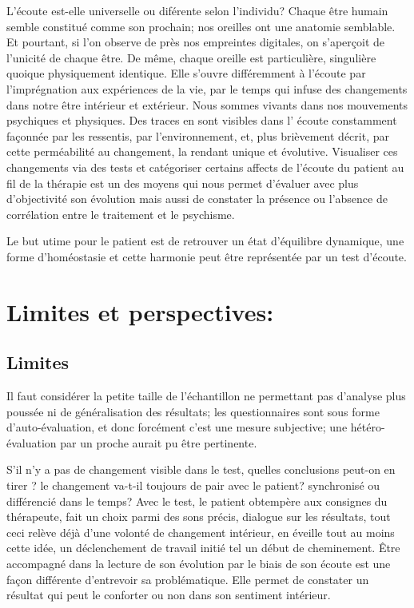   L'écoute est-elle universelle ou diférente selon l'individu?
 Chaque être humain semble constitué comme son prochain;
 nos oreilles ont  une anatomie semblable. Et pourtant, si l'on
 observe de près nos empreintes digitales, on s'aperçoit de l'unicité
 de chaque être. De même, chaque oreille est particulière, singulière
 quoique physiquement identique. Elle s'ouvre différemment à l'écoute par l'imprégnation
 aux expériences de la vie, par le temps qui infuse des changements dans
 notre être intérieur et extérieur. Nous sommes vivants dans nos
 mouvements psychiques et physiques. Des traces en sont 
 visibles dans l' écoute constamment  façonnée par les
 ressentis, par l'environnement, et, plus brièvement décrit, par cette perméabilité au
 changement, la rendant unique et évolutive.
Visualiser ces
changements via des tests et catégoriser certains affects de
l'écoute du patient au fil de la thérapie est un des moyens qui nous permet d'évaluer avec
plus d'objectivité
son évolution mais aussi
de constater la présence ou l'absence de corrélation entre le
traitement et le psychisme.


Le but utime pour le patient est de retrouver un état d'équilibre
dynamique, une forme d'homéostasie et cette harmonie peut être 
 représentée par un test d'écoute.







  \section{Limites et perspectives: }

\subsection{Limites}


  Il faut considérer la petite taille de l'échantillon ne permettant
  pas d'analyse plus poussée ni de généralisation des résultats; les
  questionnaires sont sous forme d'auto-évaluation, et donc forcément
  c'est une mesure subjective;  une hétéro-évaluation par un proche
  aurait pu être pertinente.

  
S'il n'y a pas de changement visible dans le test, quelles conclusions
peut-on en tirer ? le changement va-t-il toujours de pair avec le
patient? synchronisé ou différencié dans le temps?
Avec le test, le patient obtempère aux consignes du thérapeute, fait
un choix parmi des sons précis, dialogue sur les résultats, tout ceci
relève déjà d'une volonté de changement intérieur, en  éveille tout au
moins cette idée, un déclenchement de travail initié tel un début de cheminement.
Être accompagné dans la lecture de son évolution par le biais de
son écoute
est une façon différente d'entrevoir sa problématique. Elle permet de
constater un résultat qui  peut le conforter ou non dans son sentiment
intérieur.

